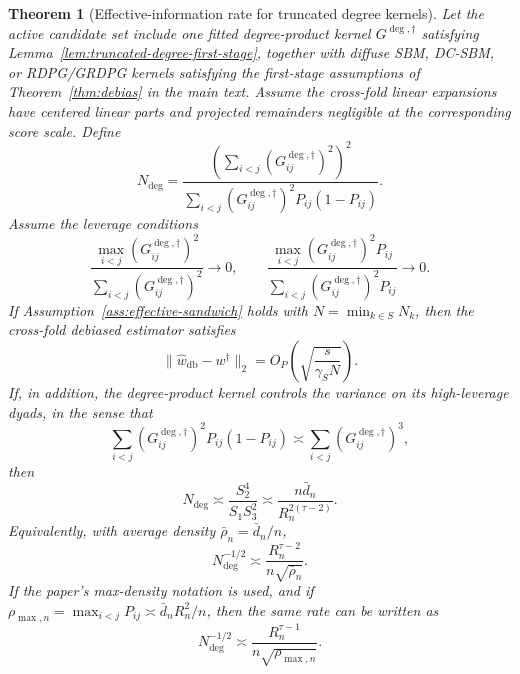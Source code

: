 \documentclass[12pt]{article}
\newtheorem{theorem}{Theorem}
\newcommand{\1}{\mathbf{1}}
\begin{document}
\begin{theorem}[Effective-information rate for truncated degree kernels]
\label{thm:truncated-degree-rate}
Let the active candidate set include one fitted degree-product kernel
\(G^{\deg,\dagger}\) satisfying Lemma~\ref{lem:truncated-degree-first-stage},
together with diffuse SBM, DC-SBM, or RDPG/GRDPG kernels satisfying the
first-stage assumptions of Theorem~\ref{thm:debias} in the main text. Assume the cross-fold
linear expansions have centered linear parts and projected remainders negligible
at the corresponding score scale. Define
\[
    N_{\deg}
    =
    \frac{
        \left(\sum_{i<j}(G^{\deg,\dagger}_{ij})^2\right)^2
    }{
        \sum_{i<j}(G^{\deg,\dagger}_{ij})^2P_{ij}(1-P_{ij})
    }.
\]
Assume the leverage conditions
\[
    \frac{\max_{i<j}(G^{\deg,\dagger}_{ij})^2}
         {\sum_{i<j}(G^{\deg,\dagger}_{ij})^2}
    \to0,
    \qquad
    \frac{\max_{i<j}(G^{\deg,\dagger}_{ij})^2P_{ij}}
         {\sum_{i<j}(G^{\deg,\dagger}_{ij})^2P_{ij}}
    \to0.
\]
If Assumption~\ref{ass:effective-sandwich} holds with
\(N=\min_{k\in S}N_k\), then the cross-fold debiased estimator satisfies
\[
    \|\widehat w_{\mathrm{db}}-w^\dagger\|_2
    =
    O_P\!\left(
        \sqrt{\frac{s}{\gamma_S N}}
    \right).
\]
If, in addition, the degree-product kernel controls the variance on its
high-leverage dyads, in the sense that
\[
    \sum_{i<j}(G^{\deg,\dagger}_{ij})^2P_{ij}(1-P_{ij})
    \asymp
    \sum_{i<j}(G^{\deg,\dagger}_{ij})^3,
\]
then
\[
    N_{\deg}
    \asymp
    \frac{S_2^4}{S_1S_3^2}
    \asymp
    \frac{n\bar d_n}{R_n^{2(\tau-2)}}.
\]
Equivalently, with average density \(\bar\rho_n=\bar d_n/n\),
\[
    N_{\deg}^{-1/2}
    \asymp
    \frac{R_n^{\tau-2}}{n\sqrt{\bar\rho_n}}.
\]
If the paper's max-density notation is used, and if
\(\rho_{\max,n}=\max_{i<j}P_{ij}\asymp\bar d_nR_n^2/n\), then the same rate can
be written as
\[
    N_{\deg}^{-1/2}
    \asymp
    \frac{R_n^{\tau-1}}{n\sqrt{\rho_{\max,n}}}.
\]
\end{theorem}
\end{document}
